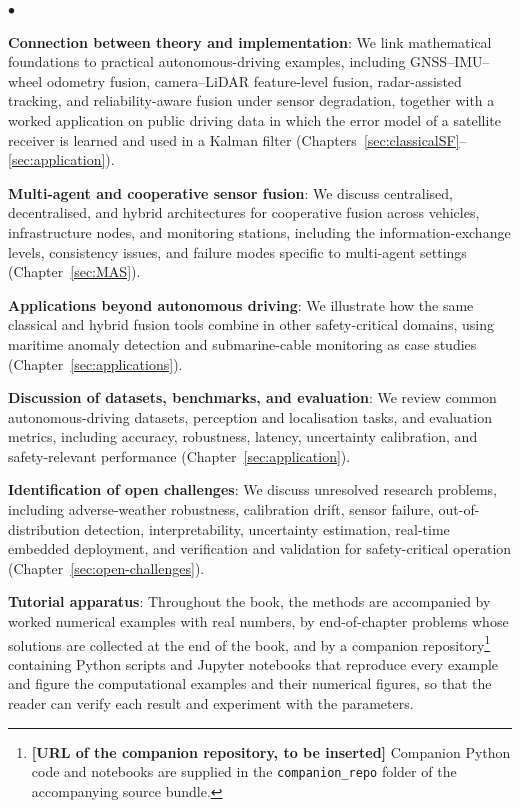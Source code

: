 \documentclass[graybox,envcountchap]{style/SNmono}
\newcommand{\repopath}[1]{\texttt{#1}}
\newenvironment{list4a}{
  \begin{list}{$\bullet$}{
      \setlength{\itemsep}{0.05cm}
      \setlength{\labelsep}{0.2cm}
      \setlength{\labelwidth}{0.3cm}
      \setlength{\parsep}{0in}
      \setlength{\parskip}{0in}
      \setlength{\topsep}{0in}
      \setlength{\partopsep}{0in}
      \setlength{\leftmargin}{0.16in}}}
      {\end{list}}
\providecommand{\DIFadd}[1]{{\protect\color{blue} #1}} %
\providecommand{\DIFdel}[1]{{\protect\color{red} #1}} %
\providecommand{\DIFaddbegin}{} %
\providecommand{\DIFaddend}{} %
\providecommand{\DIFdelbegin}{} %
\providecommand{\DIFdelend}{} %
\begin{document}
\begin{list4a}
    \item \textbf{Connection between theory and implementation}: We link mathematical foundations to practical autonomous-driving examples, including GNSS--IMU--wheel odometry fusion, camera--LiDAR feature-level fusion, radar-assisted tracking, and reliability-aware fusion under sensor degradation, together with a worked application on public driving data in which the error model of a satellite receiver is learned and used in a Kalman filter (Chapters~\ref{sec:classicalSF}--\ref{sec:application}).
    \item \textbf{Multi-agent and cooperative sensor fusion}: We discuss centralised, decentralised, and hybrid architectures for cooperative fusion across vehicles, infrastructure nodes, and monitoring stations, including the information-exchange levels, consistency issues, and failure modes specific to multi-agent settings (Chapter~\ref{sec:MAS}).
    \item \textbf{Applications beyond autonomous driving}: We illustrate how the same classical and hybrid fusion tools combine in other safety-critical domains, using maritime anomaly detection and submarine-cable monitoring as case studies (Chapter~\ref{sec:applications}).
    \item \textbf{Discussion of datasets, benchmarks, and evaluation}: We review common autonomous-driving datasets, perception and localisation tasks, and evaluation metrics, including accuracy, robustness, latency, uncertainty calibration, and safety-relevant performance (Chapter~\ref{sec:application}).
    \item \textbf{Identification of open challenges}: We discuss unresolved research problems, including adverse-weather robustness, calibration drift, sensor failure, out-of-distribution detection, interpretability, uncertainty estimation, real-time embedded deployment, and verification and validation for safety-critical operation (Chapter~\ref{sec:open-challenges}).
    \item \textbf{Tutorial apparatus}: Throughout the book, the methods are accompanied by worked numerical examples with real numbers, by end-of-chapter problems whose solutions are collected at the end of the book, and by a companion repository\footnote{\DIFdel{\textbf{[URL of the companion repository, to be inserted]}}\DIFadd{Companion Python code and notebooks are supplied in the \repopath{companion\_repo} folder of the accompanying source bundle.}} containing Python scripts and Jupyter notebooks that reproduce \DIFdelbegin \DIFdel{every example and figure}\DIFdelend \DIFaddbegin \DIFadd{the computational examples and their numerical figures}\DIFaddend , so that the reader can verify each result and experiment with the parameters.
\end{list4a}
\end{document}
